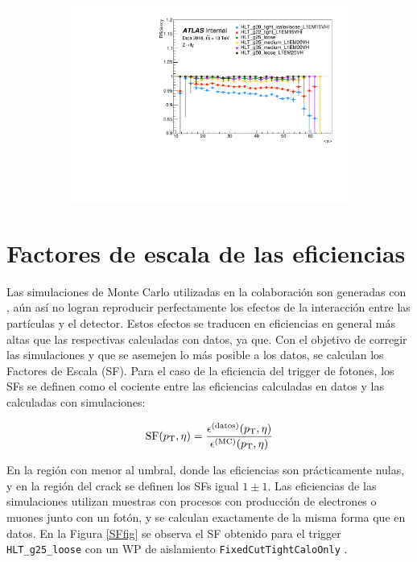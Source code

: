 \begin{figure}
\begin{subfigure}[b]{0.32\textwidth}
		\includegraphics[width=\textwidth]{images/2018_eff_mu_zoom.pdf}
	\end{subfigure}

	\label{trigEff}

\end{figure}


\section{Factores de escala de las eficiencias}

Las simulaciones de Monte Carlo utilizadas en la colaboración son generadas con , aún así no logran reproducir perfectamente los efectos de la interacción entre las partículas y el detector. Estos efectos se traducen en eficiencias en general más altas que las respectivas calculadas con datos, ya que. Con el objetivo de corregir las simulaciones y que se asemejen lo más posible a los datos, se calculan los Factores de Escala (SF). Para el caso de la eficiencia del trigger de fotones, los SFs se definen como el cociente entre las eficiencias calculadas en datos y las calculadas con simulaciones:

\begin{equation}
	\text{SF}(p_{\text{T}}, \eta) = \frac{\epsilon^{\text{(datos)}}(p_{\text{T}}, \eta)}{\epsilon^{\text{(MC)}}(p_{\text{T}}, \eta)}
\end{equation}

En la región con \pt menor al umbral, donde las eficiencias son prácticamente nulas, y en la región del crack se definen los SFs igual $1\pm1$. Las eficiencias de las simulaciones utilizan muestras con procesos con producción de electrones o muones junto con un fotón, y se calculan exactamente de la misma forma que en datos. En la Figura \ref{SFfig} se observa el SF obtenido para el trigger \texttt{HLT\_g25\_loose} con un WP de aislamiento \texttt{FixedCutTightCaloOnly} .


